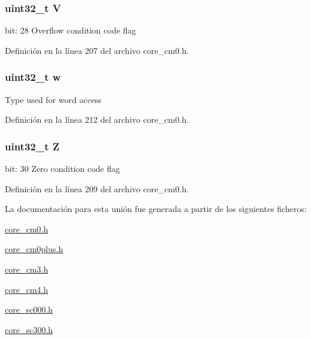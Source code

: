 \subsubsection[{\texorpdfstring{V}{V}}]{\setlength{\rightskip}{0pt plus 5cm}uint32\+\_\+t V}\hypertarget{union_a_p_s_r___type_acd4a2b64faee91e4a9eef300667fa222}{}\label{union_a_p_s_r___type_acd4a2b64faee91e4a9eef300667fa222}
bit\+: 28 Overflow condition code flag 

Definición en la línea 207 del archivo core\+\_\+cm0.\+h.

\subsubsection[{\texorpdfstring{w}{w}}]{\setlength{\rightskip}{0pt plus 5cm}uint32\+\_\+t w}\hypertarget{union_a_p_s_r___type_ad0fb62e7a08e70fc5e0a76b67809f84b}{}\label{union_a_p_s_r___type_ad0fb62e7a08e70fc5e0a76b67809f84b}
Type used for word access 

Definición en la línea 212 del archivo core\+\_\+cm0.\+h.

\subsubsection[{\texorpdfstring{Z}{Z}}]{\setlength{\rightskip}{0pt plus 5cm}uint32\+\_\+t Z}\hypertarget{union_a_p_s_r___type_a5ae954cbd9986cd64625d7fa00943c8e}{}\label{union_a_p_s_r___type_a5ae954cbd9986cd64625d7fa00943c8e}
bit\+: 30 Zero condition code flag 

Definición en la línea 209 del archivo core\+\_\+cm0.\+h.



La documentación para esta unión fue generada a partir de los siguientes ficheros\+:\begin{DoxyCompactItemize}
\item 
\hyperlink{core__cm0_8h}{core\+\_\+cm0.\+h}\item 
\hyperlink{core__cm0plus_8h}{core\+\_\+cm0plus.\+h}\item 
\hyperlink{core__cm3_8h}{core\+\_\+cm3.\+h}\item 
\hyperlink{core__cm4_8h}{core\+\_\+cm4.\+h}\item 
\hyperlink{core__sc000_8h}{core\+\_\+sc000.\+h}\item 
\hyperlink{core__sc300_8h}{core\+\_\+sc300.\+h}\end{DoxyCompactItemize}

